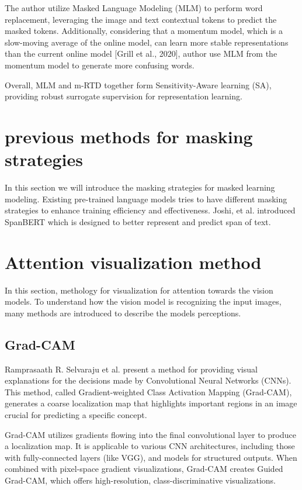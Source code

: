 The author utilize Masked Language Modeling (MLM) to perform word replacement, leveraging the image and text contextual tokens to predict the masked tokens. Additionally, considering that a momentum model, which is a slow-moving average of the online model, can learn more stable representations than the current online model [Grill et al., 2020], author use MLM from the momentum model to generate more confusing words. 

Overall, MLM and m-RTD together form Sensitivity-Aware learning (SA), providing robust surrogate supervision for representation learning.


\section{previous methods for masking strategies}

In this section we will introduce the masking strategies for masked learning modeling. Existing pre-trained language models tries to have different masking strategies to enhance training efficiency and effectiveness. 
Joshi, et al.  introduced SpanBERT which is designed to better represent and predict span of text.


\section{Attention visualization method}
In this section, methology for visualization for attention towards the vision models. To understand how the vision model is recognizing the input images, many methods are introduced to describe the models perceptions.

\subsection{Grad-CAM}
Ramprasaath R. Selvaraju et al. present a method for providing visual explanations for the decisions made by Convolutional Neural Networks (CNNs). This method, called Gradient-weighted Class Activation Mapping (Grad-CAM), generates a coarse localization map that highlights important regions in an image crucial for predicting a specific concept.

Grad-CAM utilizes gradients flowing into the final convolutional layer to produce a localization map. It is applicable to various CNN architectures, including those with fully-connected layers (like VGG), and models for structured outputs. When combined with pixel-space gradient visualizations, Grad-CAM creates Guided Grad-CAM, which offers high-resolution, class-discriminative visualizations.

